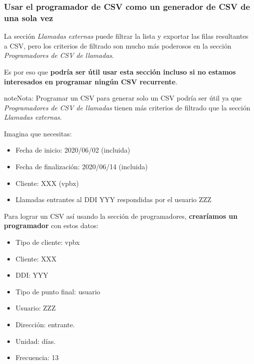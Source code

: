 \documentclass[letterpaper,10pt,spanish]{sphinxmanual}
\begin{document}
\subsubsection{Usar el programador de CSV como un generador de CSV de una sola vez}
\label{administration_portal/brand/calls/call_csv_schedulers:using-csv-scheduler-as-a-one-shot-csv-generator}
La sección \emph{Llamadas externas} puede filtrar la lista y exportar las filas resultantes a CSV, pero los criterios de filtrado son mucho más poderosos en la sección \emph{Programadores de CSV de llamadas}.

Es por eso que \textbf{podría ser útil usar esta sección incluso si no estamos interesados en programar ningún CSV recurrente}.

\begin{notice}{note}{Nota:}
Programar un CSV para generar solo un CSV podría ser útil ya que \emph{Programadores de CSV de llamadas} tienen más criterios de filtrado que la sección \emph{Llamadas externas}.
\end{notice}

Imagina que necesitas:
\begin{itemize}
\item {} 
Fecha de inicio: 2020/06/02 (incluida)

\item {} 
Fecha de finalización: 2020/06/14 (incluida)

\item {} 
Cliente: XXX (vpbx)

\item {} 
Llamadas entrantes al DDI YYY respondidas por el usuario ZZZ

\end{itemize}

Para lograr un CSV así usando la sección de programadores, \textbf{crearíamos un programador} con estos datos:
\begin{itemize}
\item {} 
Tipo de cliente: vpbx

\item {} 
Cliente: XXX

\item {} 
DDI: YYY

\item {} 
Tipo de punto final: usuario

\item {} 
Usuario: ZZZ

\item {} 
Dirección: entrante.

\item {} 
Unidad: días.

\item {} 
Frecuencia: 13

\end{itemize}
\end{document}
